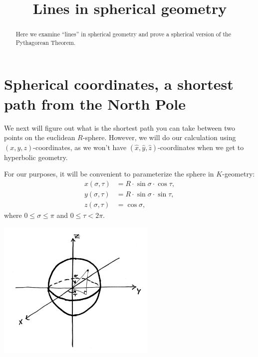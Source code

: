 \documentclass{ximera}
\title{Lines in spherical geometry}
\begin{document}
\begin{abstract}
Here we examine ``lines'' in spherical geometry and prove a spherical
version of the Pythagorean Theorem.
\end{abstract}
\maketitle


\section{Spherical coordinates, a shortest path from the North Pole}

We next will figure out what is the shortest path you can take between
two points on the euclidean $R$-sphere. However, we will do our
calculation using $(x,y,z)$-coordinates, as we won't have
$(\hat{x},\hat{y},\hat{z})$-coordinates when we get to hyperbolic
geometry.

For our purposes, it will be convenient to parameterize the sphere in
$K$-geometry:%
\begin{align*}
x(\sigma,\tau) &=R\cdot \sin\sigma\cdot \cos \tau,\\
y(\sigma,\tau) &=R\cdot \sin\sigma\cdot \sin\tau,\\
z(\sigma,\tau) &=\cos \sigma,
\end{align*}
where $0\le \sigma\le\pi$ and $0\le \tau<2\pi$.

\begin{image}
  \includegraphics[width=3in]{spherePara.jpg}
\end{image}
\end{document}
